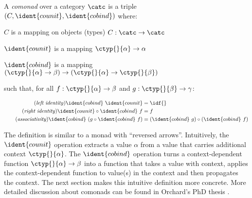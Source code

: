 \begin{definition}
A \emph{comonad} over a category $\catc$ is a triple $(C, \ident{counit}, \ident{cobind})$ where:
\begin{compactitem}
\item $C$ is a mapping on objects (types) $C : \catc \rightarrow \catc$
\item $\ident{counit}$ is a mapping $\ctyp{}{\alpha} \rightarrow \alpha$
\item $\ident{cobind}$ is a mapping $(\ctyp{}{\alpha} \rightarrow \beta)
  \rightarrow (\ctyp{}{\alpha} \rightarrow \ctyp{}{\beta})$
\end{compactitem}
%
such that, for all $f:\ctyp{}{\alpha} \rightarrow \beta$ and $g:\ctyp{}{\beta} \rightarrow \gamma$:

\begin{align}
\tag{\emph{left identity}}
  \ident{cobind}~\ident{counit} &= \idf{}
  \\
\tag{\emph{right identity}}
  \ident{counit} \circ \ident{cobind}~f &= f
  \\
\tag{\emph{associativity}}
  \ident{cobind}~(g \circ \ident{cobind}~f) &= (\ident{cobind}~g) \circ (\ident{cobind}~f)
\end{align}
\end{definition}

\noindent
The definition is similar to a monad with ``reversed arrows''. Intuitively, the $\ident{counit}$
operation extracts a value $\alpha$ from a value that carries additional context $\ctyp{}{\alpha}$.
The $\ident{cobind}$ operation turns a context-dependent function
$\ctyp{}{\alpha} \rightarrow \beta$ into a function that takes a value with context, applies
the context-dependent function to value(s) in the context and then propagates the context. The
next section makes this intuitive definition more concrete. More detailed discussion about
comonads can be found in Orchard's PhD thesis \cite{comonads-dom-thesis}.


